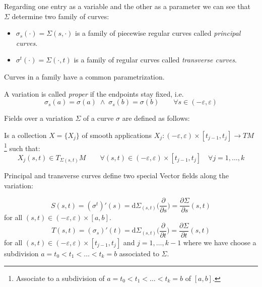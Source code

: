 \documentclass[a4paper,12pt]{scrartcl}    %
\begin{document}
 \begin{notationfix}
  Regarding one entry as a variable and the other as a parameter we can see that $\Sigma$ determine two family of curves:
  \begin{itemize}
   \item $\sigma_s(\cdot)= \Sigma(s, \cdot)$ is a family of piecewise regular curves called \emph{principal curves}.
   \item $\sigma^t(\cdot)= \Sigma(\cdot , t)$ is a family of regular curves called \emph{transverse curves}.
  \end{itemize}
  Curves in a family have a common parametrization.
 \end{notationfix}
 
 \begin{notationfix}
  A variation is called \emph{proper} if the endpoints stay fixed, i.e.
  \begin{displaymath}
   \sigma_s(a)= \sigma(a) \; \wedge \; \sigma_s(b) = \sigma(b) \qquad \forall s\in (-\varepsilon, \varepsilon)
  \end{displaymath}
 \end{notationfix}

Fields over a variation $\Sigma$ of a curve $\sigma$ are defined as follows:

 \begin{definition}
  Is a collection $X= \{X_j \}$ of smooth applications $X_j:(-\varepsilon, \varepsilon) \times [t_{j-1},t_{j}]\rightarrow TM$ \footnote{Associate to a subdivision of $ a= t_0 < t_1 < \ldots < t_k=b$ of $[a,b]$. } such that:
  \begin{displaymath}
   X_j (s,t) \in T_{\Sigma(s,t)}M \qquad \forall (s,t) \in (-\varepsilon, \varepsilon) \times [t_{j-1},t_{j}]
   \quad \forall j= 1, \ldots, k
  \end{displaymath}
 \end{definition}
 

Principal and  transverse curves define two special Vector fields along the variation:
\begin{definition}\label{Def: Variation Field}
 \begin{displaymath}
  S(s,t) = (\sigma^t)'(s) = \textrm{d}\Sigma_{(s,t)} \big( \frac{\partial}{\partial s} \big) = 
  \frac{\partial \Sigma}{\partial s} (s,t)
 \end{displaymath}
 for all $(s,t) \in (-\varepsilon, \varepsilon) \times [a,b] $.
 \begin{displaymath}
    T(s,t) = (\sigma_s)'(t) = \textrm{d}\Sigma_{(s,t)} \big( \frac{\partial}{\partial t} \big) = 
  \frac{\partial \Sigma}{\partial t} (s,t)
 \end{displaymath}
 for all $(s,t) \in (-\varepsilon, \varepsilon) \times [t_{j-1},t_{j}] $ and $j=1, \ldots, k-1$ 
 where we have choose  a subdivision $ a= t_0 < t_1 < \ldots < t_k=b$ associated to $\Sigma$.
\end{definition}
 
\end{document}
